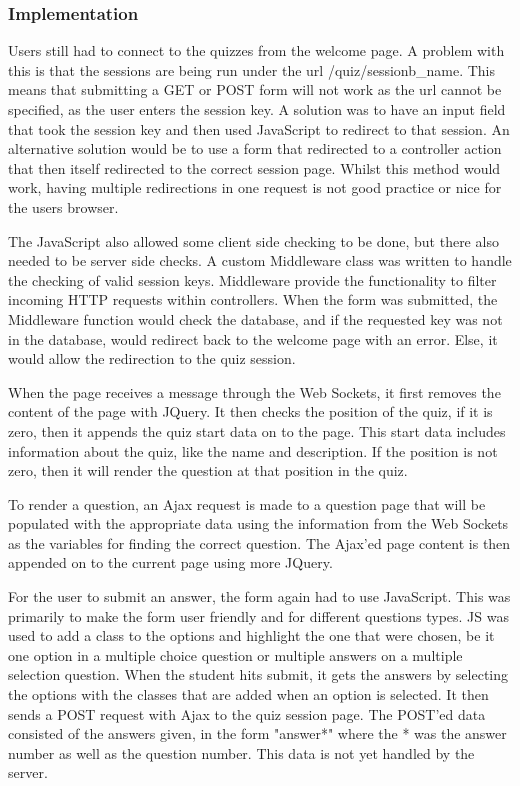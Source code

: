 \subsubsection{Implementation}
Users still had to connect to the quizzes from the welcome page. A problem with this is that the sessions are being run under the url /quiz/sessionb\_name. This means that submitting a GET or POST form will not work as the url cannot be specified, as the user enters the session key. A solution was to have an input field that took the session key and then used JavaScript to redirect to that session. An alternative solution would be to use a form that redirected to a controller action that then itself redirected to the correct session page. Whilst this method would work, having multiple redirections in one request is not good practice or nice for the users browser.

The JavaScript also allowed some client side checking to be done, but there also needed to be server side checks. A custom Middleware class was written to handle the checking of valid session keys. Middleware provide the functionality to filter incoming HTTP requests within controllers\cite{laravel-middleware}. When the form was submitted, the Middleware function would check the database, and if the requested key was not in the database, would redirect back to the welcome page with an error. Else, it would allow the redirection to the quiz session.

When the page receives a message through the Web Sockets, it first removes the content of the page with JQuery. It then checks the position of the quiz, if it is zero, then it appends the quiz start data on to the page. This start data includes information about the quiz, like the name and description. If the position is not zero, then it will render the question at that position in the quiz.

To render a question, an Ajax request is made to a question page that will be populated with the appropriate data using the information from the Web Sockets as the variables for finding the correct question. The Ajax'ed page content is then appended on to the current page using more JQuery.

For the user to submit an answer, the form again had to use JavaScript. This was primarily to make the form user friendly and for different questions types. JS was used to add a class to the options and highlight the one that were chosen, be it one option in a multiple choice question or multiple answers on a multiple selection question. When the student hits submit, it gets the answers by selecting the options with the classes that are added when an option is selected. It then sends a POST request with Ajax to the quiz session page. The POST'ed data consisted of the answers given, in the form "answer*" where the * was the answer number as well as the question number. This data is not yet handled by the server.


